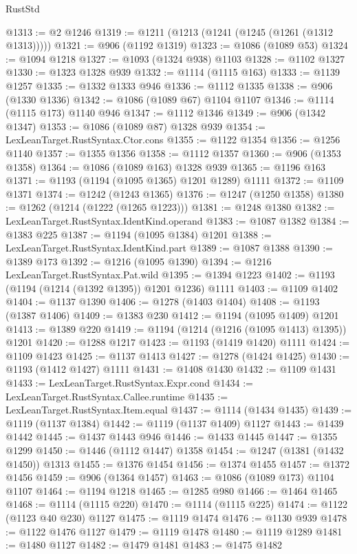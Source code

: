 \begin{lexlean}{RustStd}
\begin{coremodule}
@1313 := @2 @1246
@1319 := @1211 (@1213 (@1241 (@1245 (@1261 (@1312 @1313)))))
@1321 := @906 (@1192 @1319)
@1323 := @1086 (@1089 @53)
@1324 := @1094 @1218
@1327 := @1093 (@1324 @938) @1103
@1328 := @1102 @1327
@1330 := @1323 @1328 @939
@1332 := @1114 (@1115 @163)
@1333 := @1139 @1257
@1335 := @1332 @1333 @946
@1336 := @1112 @1335
@1338 := @906 (@1330 @1336)
@1342 := @1086 (@1089 @67) @1104 @1107
@1346 := @1114 (@1115 @173) @1140 @946
@1347 := @1112 @1346
@1349 := @906 (@1342 @1347)
@1353 := @1086 (@1089 @87) @1328 @939
@1354 := LexLeanTarget.RustSyntax.Ctor.cons
@1355 := @1122 @1354
@1356 := @1256 @1140
@1357 := @1355 @1356
@1358 := @1112 @1357
@1360 := @906 (@1353 @1358)
@1364 := @1086 (@1089 @163) @1328 @939
@1365 := @1196 @163
@1371 := @1193 (@1194 (@1095 @1365) @1201 @1289) @1111
@1372 := @1109 @1371
@1374 := @1242 (@1243 @1365)
@1376 := @1247 (@1250 @1358)
@1380 := @1262 (@1214 (@1222 (@1265 @1223)))
@1381 := @1248 @1380
@1382 := LexLeanTarget.RustSyntax.IdentKind.operand
@1383 := @1087 @1382
@1384 := @1383 @225
@1387 := @1194 (@1095 @1384) @1201
@1388 := LexLeanTarget.RustSyntax.IdentKind.part
@1389 := @1087 @1388
@1390 := @1389 @173
@1392 := @1216 (@1095 @1390)
@1394 := @1216 LexLeanTarget.RustSyntax.Pat.wild
@1395 := @1394 @1223
@1402 := @1193 (@1194 (@1214 (@1392 @1395)) @1201 @1236) @1111
@1403 := @1109 @1402
@1404 := @1137 @1390
@1406 := @1278 (@1403 @1404)
@1408 := @1193 (@1387 @1406)
@1409 := @1383 @230
@1412 := @1194 (@1095 @1409) @1201
@1413 := @1389 @220
@1419 := @1194 (@1214 (@1216 (@1095 @1413) @1395)) @1201
@1420 := @1288 @1217
@1423 := @1193 (@1419 @1420) @1111
@1424 := @1109 @1423
@1425 := @1137 @1413
@1427 := @1278 (@1424 @1425)
@1430 := @1193 (@1412 @1427) @1111
@1431 := @1408 @1430
@1432 := @1109 @1431
@1433 := LexLeanTarget.RustSyntax.Expr.cond
@1434 := LexLeanTarget.RustSyntax.Callee.runtime
@1435 := LexLeanTarget.RustSyntax.Item.equal
@1437 := @1114 (@1434 @1435)
@1439 := @1119 (@1137 @1384)
@1442 := @1119 (@1137 @1409) @1127
@1443 := @1439 @1442
@1445 := @1437 @1443 @946
@1446 := @1433 @1445
@1447 := @1355 @1299
@1450 := @1446 (@1112 @1447) @1358
@1454 := @1247 (@1381 (@1432 @1450)) @1313
@1455 := @1376 @1454
@1456 := @1374 @1455
@1457 := @1372 @1456
@1459 := @906 (@1364 @1457)
@1463 := @1086 (@1089 @173) @1104 @1107
@1464 := @1194 @1218
@1465 := @1285 @980
@1466 := @1464 @1465
@1468 := @1114 (@1115 @220)
@1470 := @1114 (@1115 @225)
@1474 := @1122 (@1123 @40 @230) @1127
@1475 := @1119 @1474
@1476 := @1130 @939
@1478 := @1122 @1476 @1127
@1479 := @1119 @1478
@1480 := @1119 @1289
@1481 := @1480 @1127
@1482 := @1479 @1481
@1483 := @1475 @1482

\end{coremodule}
\end{lexlean}
